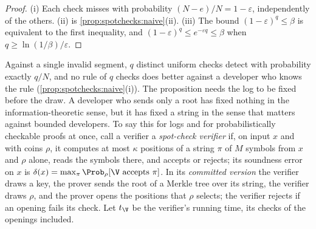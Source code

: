 \begin{refsection}

\begin{proof}
(i) Each check misses with probability $(N-e)/N=1-\varepsilon$, independently of the others. (ii) is \cref{prop:spotchecks:naive}(ii). (iii) The bound $(1-\varepsilon)^q\le\beta$ is equivalent to the first inequality, and $(1-\varepsilon)^q\le e^{-\varepsilon q}\le\beta$ when $q\ge\ln(1/\beta)/\varepsilon$.
\end{proof}

Against a single invalid segment, $q$ distinct uniform checks detect with probability exactly $q/N$, and no rule of $q$ checks does better against a developer who knows the rule (\cref{prop:spotchecks:naive}(i)). The proposition needs the log to be fixed before the draw. A developer who sends only a root has fixed nothing in the information-theoretic sense, but it has fixed a string in the sense that matters against bounded developers. To say this for logs and for probabilistically checkable proofs at once, call a verifier a \emph{spot-check verifier} if, on input $x$ and with coins $\rho$, it computes at most $\kappa$ positions of a string $\pi$ of $M$ symbols from $x$ and $\rho$ alone, reads the symbols there, and accepts or rejects; its soundness error on $x$ is $\delta(x)=\max_\pi\Prob_\rho[\V\text{ accepts }\pi]$. In its \emph{committed version} the verifier draws a key, the prover sends the root of a Merkle tree over its string, the verifier draws $\rho$, and the prover opens the positions that $\rho$ selects; the verifier rejects if an opening fails its check. Let $t_{\V}$ be the verifier's running time, its checks of the openings included.


\end{refsection}
